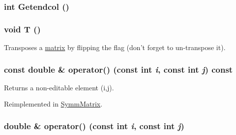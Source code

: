 \label{classJKBuilder_1_1DistributedMatrix_a9b957ebb8465bd874870a302cb9fc1a2}
\hypertarget{classJKBuilder_1_1DistributedMatrix_a800352b707ea98657805568e3c0ed8a7}{
\subsubsection[{Getendcol}]{\setlength{\rightskip}{0pt plus 5cm}int Getendcol ()}}
\label{classJKBuilder_1_1DistributedMatrix_a800352b707ea98657805568e3c0ed8a7}
\hypertarget{classJKBuilder_1_1matrix_af2563817f6505e9f8a6ee5c5c209a115}{
\subsubsection[{T}]{\setlength{\rightskip}{0pt plus 5cm}void T ()}}
\label{classJKBuilder_1_1matrix_af2563817f6505e9f8a6ee5c5c209a115}


Transposes a \hyperlink{classJKBuilder_1_1matrix}{matrix} by flipping the flag (don't forget to un-\/transpose it). \hypertarget{classJKBuilder_1_1matrix_a9ccbac42f4eefb704f04886001f4fb3e}{
\subsubsection[{operator()}]{\setlength{\rightskip}{0pt plus 5cm}const double \& operator() (const int {\em i}, \/  const int {\em j}) const}}
\label{classJKBuilder_1_1matrix_a9ccbac42f4eefb704f04886001f4fb3e}


Returns a non-\/editable element (i,j). 

Reimplemented in \hyperlink{classJKBuilder_1_1SymmMatrix_a9ccbac42f4eefb704f04886001f4fb3e}{SymmMatrix}.\hypertarget{classJKBuilder_1_1matrix_a3d7fca183ff1c9f4c160218746f2ef31}{
\subsubsection[{operator()}]{\setlength{\rightskip}{0pt plus 5cm}double \& operator() (const int {\em i}, \/  const int {\em j})}}
\label{classJKBuilder_1_1matrix_a3d7fca183ff1c9f4c160218746f2ef31}


